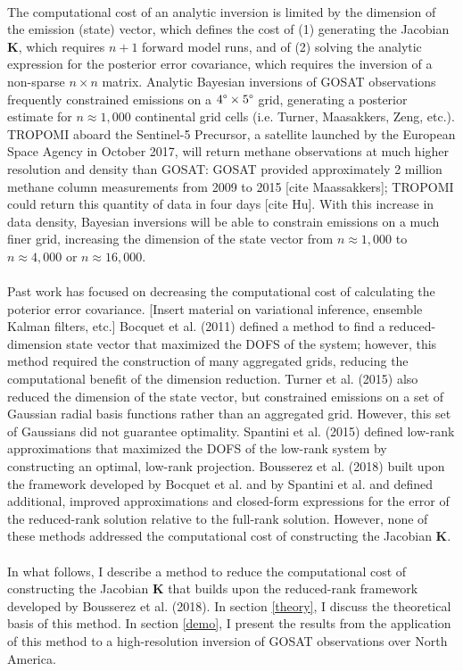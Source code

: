 \documentclass{article}
\newcommand{\K}{\mathbf{K}}
\begin{document}
\\
The computational cost of an analytic inversion is limited by the dimension of the emission (state) vector, which defines the cost of (1) generating the Jacobian $\K$, which requires $n+1$ forward model runs, and of (2) solving the analytic expression for the posterior error covariance, which requires the inversion of a non-sparse $n \times n$ matrix. Analytic Bayesian inversions of GOSAT observations frequently constrained emissions on a $4\degree \times 5\degree$ grid, generating a posterior estimate for $n \approx 1,000$ continental grid cells (i.e. Turner, Maasakkers, Zeng, etc.). TROPOMI aboard the Sentinel-5 Precursor, a satellite launched by the European Space Agency in October 2017, will return methane observations at much higher resolution and density than GOSAT: GOSAT provided approximately 2 million methane column measurements from 2009 to 2015 [cite Maassakkers]; TROPOMI could return this quantity of data in four days [cite Hu]. With this increase in data density, Bayesian inversions will be able to constrain emissions on a much finer grid, increasing the dimension of the state vector from $n \approx 1,000$ to $n \approx 4,000$ or $n \approx 16,000$.\\
\\
Past work has focused on decreasing the computational cost of calculating the poterior error covariance. [Insert material on variational inference, ensemble Kalman filters, etc.] Bocquet et al. (2011) defined a method to find a reduced-dimension state vector that maximized the DOFS of the system; however, this method required the construction of many aggregated grids, reducing the computational benefit of the dimension reduction. Turner et al. (2015) also reduced the dimension of the state vector, but constrained emissions on a set of Gaussian radial basis functions rather than an aggregated grid. However, this set of Gaussians did not guarantee optimality. Spantini et al. (2015) defined low-rank approximations that maximized the DOFS of the low-rank system by constructing an optimal, low-rank projection. Bousserez et al. (2018) built upon the framework developed by Bocquet et al. and by Spantini et al. and defined additional, improved approximations and closed-form expressions for the error of the reduced-rank solution relative to the full-rank solution. However, none of these methods addressed the computational cost of constructing the Jacobian $\K$.\\
\\
In what follows, I describe a method to reduce the computational cost of constructing the Jacobian $\K$ that builds upon the reduced-rank framework developed by Bousserez et al. (2018). In section \ref{theory}, I discuss the theoretical basis of this method. In section \ref{demo}, I present the results from the application of this method to a high-resolution inversion of GOSAT observations over North America.
\end{document}
